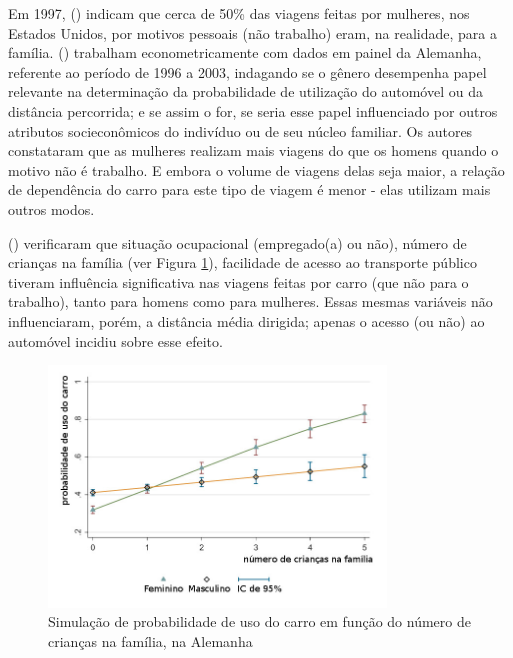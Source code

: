 

Em 1997,  (\citeyear{ROOT1999}) indicam que cerca de 50\% das viagens feitas por mulheres, nos Estados Unidos, por motivos pessoais (não trabalho) eram, na realidade, para a família.
 (\citeyear{VANCE2007}) trabalham econometricamente com dados em painel da Alemanha, referente ao período de 1996 a 2003, indagando se o gênero desempenha papel relevante na determinação da probabilidade de utilização do automóvel ou da distância percorrida; e se assim o for, se seria esse papel influenciado por outros atributos socieconômicos do indivíduo ou de seu núcleo familiar. 
Os autores constataram que as mulheres realizam mais viagens do que os homens quando o motivo não é trabalho. E embora o volume de viagens delas seja maior, a relação de dependência do carro para este tipo de viagem é menor - elas utilizam mais outros modos.




 (\citeyear{VANCE2007}) verificaram que situação ocupacional (empregado(a) ou não), número de crianças na família (ver Figura \ref{fig:prob-uso-carro}), facilidade de acesso ao transporte público tiveram influência significativa nas viagens feitas por carro (que não para o trabalho), tanto para homens como para mulheres. Essas mesmas variáveis não influenciaram, porém, a distância média dirigida; apenas o acesso (ou não) ao automóvel incidiu sobre esse efeito. 

\begin{figure}[htb]%
    \caption{\label{fig:prob-uso-carro}Simulação de probabilidade de uso do carro em função do número de crianças na família, na Alemanha}%
    \begin{center}%
        \includegraphics[width=0.8\textwidth]{./imagens/prob-uso-carro.jpg}%
    \end{center}%
\end{figure}%

